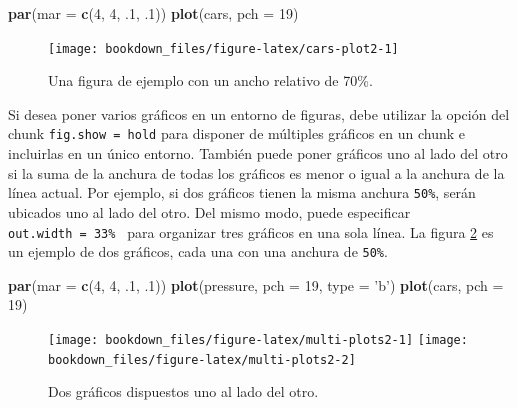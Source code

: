 \documentclass[12pt,]{krantz}
\makeatletter
\newenvironment{Shaded}{\begin{snugshade}}{\end{snugshade}}
\newcommand{\KeywordTok}[1]{\textcolor[rgb]{0.13,0.29,0.53}{\textbf{#1}}}
\newcommand{\DataTypeTok}[1]{\textcolor[rgb]{0.13,0.29,0.53}{#1}}
\newcommand{\DecValTok}[1]{\textcolor[rgb]{0.00,0.00,0.81}{#1}}
\newcommand{\StringTok}[1]{\textcolor[rgb]{0.31,0.60,0.02}{#1}}
\newcommand{\NormalTok}[1]{#1}
\newenvironment{kframe}{%
\medskip{}
\setlength{\fboxsep}{.8em}
 \def\at@end@of@kframe{}%
 \ifinner\ifhmode%
  \def\at@end@of@kframe{\end{minipage}}%
  \begin{minipage}{\columnwidth}%
 \fi\fi%
 \def\FrameCommand##1{\hskip\@totalleftmargin \hskip-\fboxsep
 \colorbox{shadecolor}{##1}\hskip-\fboxsep
     \hskip-\linewidth \hskip-\@totalleftmargin \hskip\columnwidth}%
 \MakeFramed {\advance\hsize-\width
   \@totalleftmargin\z@ \linewidth\hsize
   \@setminipage}}%
 {\par\unskip\endMakeFramed%
 \at@end@of@kframe}
\renewenvironment{Shaded}{\begin{kframe}}{\end{kframe}}
\theoremstyle{definition}
\theoremstyle{definition}
\theoremstyle{definition}
\theoremstyle{remark}
\makeatother
\begin{document}
\begin{Shaded}
\begin{Highlighting}[]
\KeywordTok{par}\NormalTok{(}\DataTypeTok{mar =} \KeywordTok{c}\NormalTok{(}\DecValTok{4}\NormalTok{, }\DecValTok{4}\NormalTok{, .}\DecValTok{1}\NormalTok{, .}\DecValTok{1}\NormalTok{))}
\KeywordTok{plot}\NormalTok{(cars, }\DataTypeTok{pch =} \DecValTok{19}\NormalTok{)}
\end{Highlighting}
\end{Shaded}

\begin{figure}
\texttt{[image: bookdown\_files/figure-latex/cars-plot2-1]} \caption{Una figura de ejemplo con un ancho relativo de 70\%.}\label{fig:cars-plot2}
\end{figure}

Si desea poner varios gráficos en un entorno de figuras, debe utilizar
la opción del chunk
\texttt{fig.show\ =\ \textquotesingle{}hold\textquotesingle{}} para
disponer de múltiples gráficos en un chunk e incluirlas en un único
entorno. También puede poner gráficos uno al lado del otro si la suma de
la anchura de todas los gráficos es menor o igual a la anchura de la
línea actual. Por ejemplo, si dos gráficos tienen la misma anchura
\texttt{50\%}, serán ubicados uno al lado del otro. Del mismo modo,
puede especificar
\texttt{out.width\ =\ \textquotesingle{}33\%\ \textquotesingle{}} para
organizar tres gráficos en una sola línea. La figura
\ref{fig:multi-plots2} es un ejemplo de dos gráficos, cada una con una
anchura de \texttt{50\%}.

\begin{Shaded}
\begin{Highlighting}[]
\KeywordTok{par}\NormalTok{(}\DataTypeTok{mar =} \KeywordTok{c}\NormalTok{(}\DecValTok{4}\NormalTok{, }\DecValTok{4}\NormalTok{, .}\DecValTok{1}\NormalTok{, .}\DecValTok{1}\NormalTok{))}
\KeywordTok{plot}\NormalTok{(pressure, }\DataTypeTok{pch =} \DecValTok{19}\NormalTok{, }\DataTypeTok{type =} \StringTok{'b'}\NormalTok{)}
\KeywordTok{plot}\NormalTok{(cars, }\DataTypeTok{pch =} \DecValTok{19}\NormalTok{)}
\end{Highlighting}
\end{Shaded}

\begin{figure}
\texttt{[image: bookdown\_files/figure-latex/multi-plots2-1]} \texttt{[image: bookdown\_files/figure-latex/multi-plots2-2]} \caption{Dos gráficos dispuestos uno al lado del otro.}\label{fig:multi-plots2}
\end{figure}
\end{document}
